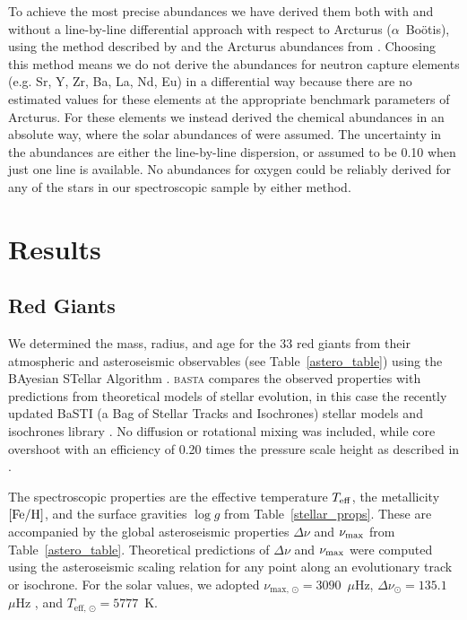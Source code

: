 \documentclass[a4paper,fleqn,usenatbib]{mnras}
\newcommand{\numax}{\mbox{$\nu_{\rm max}$}\xspace}
\newcommand{\Dnu}{\mbox{$\Delta \nu$}\xspace}
\newcommand{\teff}{\mbox{$T_{\rm eff}$}\xspace}
\newcommand{\logg}{\mbox{$\log g$}\xspace}
\newcommand{\feh}{\mbox{$\rm{[Fe/H]}$}\xspace}
\begin{document}
To achieve the most precise abundances we have derived them both with and without a line-by-line differential approach with respect to Arcturus ($\alpha$~Bo\"{o}tis), using the method described by \citet{hawkinsapogee} and the Arcturus abundances from \citet{gaiabenchmark4}. Choosing this method means we do not derive the abundances for neutron capture  elements (e.g. Sr, Y, Zr, Ba, La, Nd, Eu) in a differential way because there are no estimated values for these elements at the appropriate benchmark parameters of Arcturus. For these elements we instead derived the chemical abundances in an absolute way, where the solar abundances of \cite{Asplund2005} were assumed. The uncertainty in the abundances are either the line-by-line dispersion, or assumed to be 0.10 when just one line is available. No abundances for oxygen could be reliably derived for any of the stars in our spectroscopic sample by either method.







\section{Results}
\label{targets}

\subsection{Red Giants}
\label{rgs}

We determined the mass, radius, and age for the 33 red giants from their atmospheric and asteroseismic observables (see Table~\ref{astero_table}) using the BAyesian STellar Algorithm \citep[\textsc{basta}][]{silvaaguirre2015,silvaaguirre2017}. \textsc{basta} compares the observed properties with predictions from theoretical models of stellar evolution, in this case the recently updated BaSTI (a Bag of Stellar Tracks and Isochrones) stellar models and isochrones library \citep{Hidalgo:2018dy}. No diffusion or rotational mixing was included, while core overshoot with an efficiency of 0.20 times the pressure scale height as described in \citet{Hidalgo:2018dy}.

The spectroscopic properties are the effective temperature \teff, the metallicity \feh, and the surface gravities \logg from Table~\ref{stellar_props}. These are accompanied by the global asteroseismic properties \Dnu and \numax from Table~\ref{astero_table}. Theoretical predictions of \Dnu and \numax were computed using the asteroseismic scaling relation for any point along an evolutionary track or isochrone. For the solar values, we adopted $\nu_{\text{max, }\odot}=3090$~$\mu$Hz, $\Delta\nu_{\odot}=135.1$~$\mu$Hz \citep{huber2011}, and $T_{\text{eff, }\odot}=5777$~K.
\newpage
\end{document}
